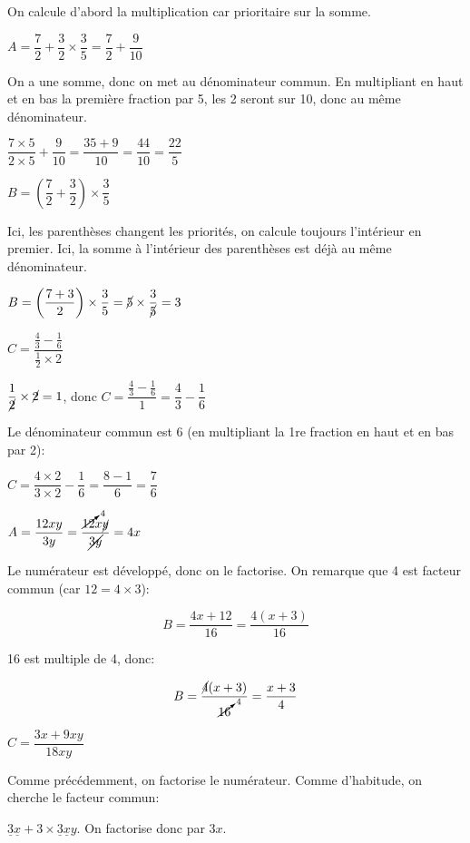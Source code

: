 \documentclass[a4paper,12pt]{scrartcl}
\begin{document}

\question{}
On calcule d'abord la multiplication car prioritaire sur la somme.

$A = \dfrac{7}{2} + \dfrac{3}{2} \times \dfrac{3}{5} = \dfrac{7}{2} + \dfrac{9}{10}$

On a une somme, donc on met au dénominateur commun. En multipliant en haut et en bas la première fraction par 5, les 2 seront sur 10, donc au même dénominateur.

$\dfrac{7 \times 5}{2 \times 5} + \dfrac{9}{10} = \dfrac{35 + 9}{10} = \dfrac{44}{10} = \dfrac{22}{5}$

\question{}
$B = \left( \dfrac{7}{2} + \dfrac{3}{2} \right) \times \dfrac{3}{5}$

Ici, les parenthèses changent les priorités, on calcule toujours l'intérieur en premier. Ici, la somme à l'intérieur des parenthèses est déjà au même dénominateur.

$B = \left( \dfrac{7+3}{2} \right) \times \dfrac{3}{5} = \cancel{5} \times \dfrac{3}{\cancel{5}} = 3$

\question{}
$C = \dfrac{\frac{4}{3} - \frac{1}{6}}{\frac{1}{2} \times 2}$

$\dfrac{1}{\cancel{2}} \times \cancel{2} = 1$, donc $C = \dfrac{\frac{4}{3} - \frac{1}{6}}{1} = \dfrac{4}{3} - \dfrac{1}{6}$

Le dénominateur commun est 6 (en multipliant la 1re fraction en haut et en bas par 2):

$C = \dfrac{4 \times 2}{3 \times 2} - \dfrac{1}{6} = \dfrac{8-1}{6} = \dfrac{7}{6}$


\question{}
$A = \dfrac{12xy}{3y} = \dfrac{\cancelto{4}{12}x\cancel{y}}{\cancel{3y}} = 4x$

\question{}
Le numérateur est développé, donc on le factorise. On remarque que 4 est facteur commun (car $12 = 4 \times 3$):

$$B = \dfrac{4x+12}{16} = \dfrac{4(x+3)}{16}$$

16 est multiple de 4, donc:

$$B = \dfrac{\cancel{4}(x+3)}{\cancelto{4}{16}} = \dfrac{x+3}{4}$$

\question{}
$C = \dfrac{3x+9xy}{18xy}$

Comme précédemment, on factorise le numérateur. Comme d'habitude, on cherche le facteur commun:

$\underline{3}\underline{x}+ 3 \times \underline{3}\underline{x}y$. On factorise donc par $3x$. 
\end{document}

